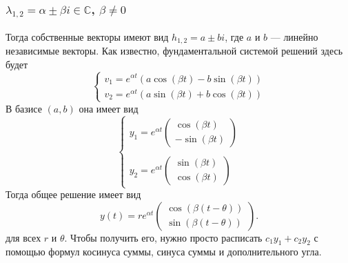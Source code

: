 \subsubsection{$\lambda_{1, 2} = \alpha \pm \beta i \in \mathbb{C}$, $\beta \neq 0$}
Тогда собственные векторы имеют вид $h_{1,2} = a \pm b i$, где $a$ и $b$ --- линейно независимые векторы.
Как известно, фундаментальной системой решений здесь будет
\[
    \begin{cases}
        v_1 = e^{\alpha t}(a \cos(\beta t) - b \sin(\beta t))\\
        v_2 = e^{\alpha t}(a \sin(\beta t) + b \cos(\beta t))
    \end{cases}
\]
В базисе $(a, b)$ она имеет вид
\[
    \begin{cases}
        y_1 = e^{\alpha t}
        \begin{pmatrix}
            \cos(\beta t) \\
            -\sin(\beta t)
        \end{pmatrix} \\\\

        y_2 = e^{\alpha t}
        \begin{pmatrix}
            \sin(\beta t) \\
            \cos(\beta t)
        \end{pmatrix}
    \end{cases}
\]
Тогда общее решение имеет вид
\[
    y(t) = r e^{\alpha t}
    \begin{pmatrix}
        \cos(\beta (t - \theta)) \\
        \sin(\beta (t - \theta))
    \end{pmatrix}.
\]
для всех $r$ и $\theta$. Чтобы получить его, нужно просто расписать $c_1 y_1 + c_2 y_2$ с помощью формул косинуса суммы, синуса суммы и дополнительного угла.

